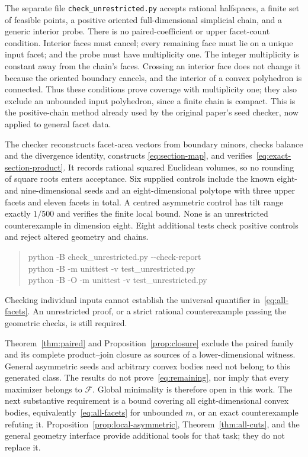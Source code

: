 \documentclass[11pt,a4paper]{article}
\begin{document}
The separate file \texttt{check\_unrestricted.py} accepts rational
halfspaces, a finite set of feasible points, a positive oriented
full-dimensional simplicial chain, and a generic interior probe. There
is no paired-coefficient or upper facet-count condition. Interior faces
must cancel; every remaining face must lie on a unique input facet; and
the probe must have multiplicity one. The integer multiplicity is
constant away from the chain's faces. Crossing an interior face does
not change it because the oriented boundary cancels, and the interior
of a convex polyhedron is connected. Thus these conditions prove
coverage with multiplicity one; they also exclude an unbounded input
polyhedron, since a finite chain is compact. This is the positive-chain
method already used by the original paper's seed checker, now applied
to general facet data.

The checker reconstructs facet-area vectors from boundary minors,
checks balance and the divergence identity, constructs
\eqref{eq:section-map}, and verifies~\eqref{eq:exact-section-product}.
It records rational squared Euclidean volumes, so no rounding of square
roots enters acceptance. Six supplied controls include the known
eight- and nine-dimensional seeds and an eight-dimensional polytope
with three upper facets and eleven facets in total. A centred asymmetric
control has tilt range exactly $1/500$ and verifies the finite local bound.
None is an
unrestricted counterexample in dimension eight. Eight additional tests
check positive controls and reject altered geometry and chains.
\begin{quote}\small\ttfamily
python -B check\_unrestricted.py -{}-check-report\\
python -B -m unittest -v test\_unrestricted.py\\
python -B -O -m unittest -v test\_unrestricted.py
\end{quote}
Checking individual inputs cannot establish the universal quantifier
in~\eqref{eq:all-facets}. An unrestricted proof, or a strict rational
counterexample passing the geometric checks, is still required.

Theorem~\ref{thm:paired} and Proposition~\ref{prop:closure} exclude the paired
family and its complete product--join closure as sources of a
lower-dimensional witness. General asymmetric seeds and arbitrary convex
bodies need not belong to this generated class. The results do not
prove~\eqref{eq:remaining}, nor imply that every maximizer belongs to
$\mathcal F$. Global minimality is therefore open in this work. The next
substantive requirement is a bound covering all eight-dimensional convex
bodies, equivalently~\eqref{eq:all-facets} for unbounded $m$, or an exact
counterexample refuting it. Proposition~\ref{prop:local-asymmetric},
Theorem~\ref{thm:all-cuts}, and the general geometry interface provide
additional tools for that task;
they do not replace it.
\end{document}
